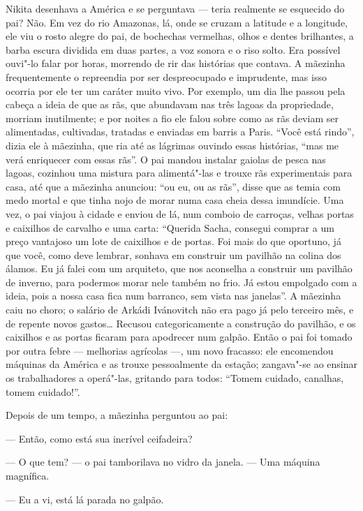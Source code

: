 Nikita desenhava a América e se perguntava --- teria realmente se
esquecido do pai? Não. Em vez do rio Amazonas, lá, onde se cruzam a
latitude e a longitude, ele viu o rosto alegre do pai, de bochechas
vermelhas, olhos e dentes brilhantes, a barba escura dividida em duas
partes, a voz sonora e o riso solto. Era possível ouvi"-lo falar por
horas, morrendo de rir das histórias que contava. A mãezinha
frequentemente o repreendia por ser despreocupado e imprudente, mas isso
ocorria por ele ter um caráter muito vivo. Por exemplo, um dia lhe
passou pela cabeça a ideia de que as rãs, que abundavam nas três lagoas
da propriedade, morriam inutilmente; e por noites a fio ele falou sobre
como as rãs deviam ser alimentadas, cultivadas, tratadas e enviadas em
barris a Paris. ``Você está rindo'', dizia ele à mãezinha, que ria até
as lágrimas ouvindo essas histórias, ``mas me verá enriquecer com essas
rãs''. O pai mandou instalar gaiolas de pesca nas lagoas, cozinhou uma
mistura para alimentá"-las e trouxe rãs experimentais para casa, até que
a mãezinha anunciou: ``ou eu, ou as rãs'', disse que as temia com medo
mortal e que tinha nojo de morar numa casa cheia dessa imundície. Uma
vez, o pai viajou à cidade e enviou de lá, num comboio de carroças,
velhas portas e caixilhos de carvalho e uma carta: ``Querida Sacha,
consegui comprar a um preço vantajoso um lote de caixilhos e de portas.
Foi mais do que oportuno, já que você, como deve lembrar, sonhava em
construir um pavilhão na colina dos álamos. Eu já falei com um
arquiteto, que nos aconselha a construir um pavilhão de inverno, para
podermos morar nele também no frio. Já estou empolgado com a ideia, pois
a nossa casa fica num barranco, sem vista nas janelas''. A mãezinha caiu
no choro; o salário de Arkádi Ivánovitch não era pago já pelo terceiro
mês, e de repente novos gastos\ldots{} Recusou categoricamente a construção
do pavilhão, e os caixilhos e as portas ficaram para apodrecer num
galpão. Então o pai foi tomado por outra febre --- melhorias agrícolas
---, um novo fracasso: ele encomendou máquinas da América e as trouxe
pessoalmente da estação; zangava"-se ao ensinar os trabalhadores a
operá"-las, gritando para todos: ``Tomem cuidado, canalhas, tomem
cuidado!''.

Depois de um tempo, a mãezinha perguntou ao pai:

--- Então, como está sua incrível ceifadeira?

--- O que tem? --- o pai tamborilava no vidro da janela. --- Uma máquina
magnífica.

--- Eu a vi, está lá parada no galpão.

